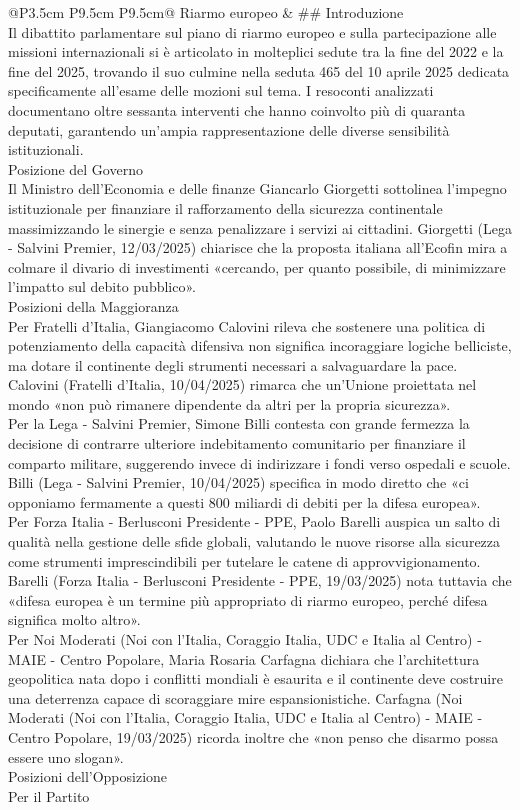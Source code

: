 \documentclass[a4paper,11pt]{article}
\begin{document}
\begin{landscape}
\begin{longtable}{@{}P{3.5cm} P{9.5cm} P{9.5cm}@{}}
\midrule
Riarmo europeo & \#\# Introduzione\\[6pt] Il dibattito parlamentare sul piano di riarmo europeo e sulla partecipazione alle missioni internazionali si è articolato in molteplici sedute tra la fine del 2022 e la fine del 2025, trovando il suo culmine nella seduta 465 del 10 aprile 2025 dedicata specificamente all'esame delle mozioni sul tema. I resoconti analizzati documentano oltre sessanta interventi che hanno coinvolto più di quaranta deputati, garantendo un'ampia rappresentazione delle diverse sensibilità istituzionali.\\[6pt] Posizione del Governo\\[6pt] Il Ministro dell'Economia e delle finanze Giancarlo Giorgetti sottolinea l'impegno istituzionale per finanziare il rafforzamento della sicurezza continentale massimizzando le sinergie e senza penalizzare i servizi ai cittadini. Giorgetti (Lega - Salvini Premier, 12/03/2025) chiarisce che la proposta italiana all'Ecofin mira a colmare il divario di investimenti «cercando, per quanto possibile, di minimizzare l'impatto sul debito pubblico».\\[6pt] Posizioni della Maggioranza\\[6pt] Per Fratelli d'Italia, Giangiacomo Calovini rileva che sostenere una politica di potenziamento della capacità difensiva non significa incoraggiare logiche belliciste, ma dotare il continente degli strumenti necessari a salvaguardare la pace. Calovini (Fratelli d'Italia, 10/04/2025) rimarca che un'Unione proiettata nel mondo «non può rimanere dipendente da altri per la propria sicurezza».\\[6pt] Per la Lega - Salvini Premier, Simone Billi contesta con grande fermezza la decisione di contrarre ulteriore indebitamento comunitario per finanziare il comparto militare, suggerendo invece di indirizzare i fondi verso ospedali e scuole. Billi (Lega - Salvini Premier, 10/04/2025) specifica in modo diretto che «ci opponiamo fermamente a questi 800 miliardi di debiti per la difesa europea».\\[6pt] Per Forza Italia - Berlusconi Presidente - PPE, Paolo Barelli auspica un salto di qualità nella gestione delle sfide globali, valutando le nuove risorse alla sicurezza come strumenti imprescindibili per tutelare le catene di approvvigionamento. Barelli (Forza Italia - Berlusconi Presidente - PPE, 19/03/2025) nota tuttavia che «difesa europea è un termine più appropriato di riarmo europeo, perché difesa significa molto altro».\\[6pt] Per Noi Moderati (Noi con l'Italia, Coraggio Italia, UDC e Italia al Centro) - MAIE - Centro Popolare, Maria Rosaria Carfagna dichiara che l'architettura geopolitica nata dopo i conflitti mondiali è esaurita e il continente deve costruire una deterrenza capace di scoraggiare mire espansionistiche. Carfagna (Noi Moderati (Noi con l'Italia, Coraggio Italia, UDC e Italia al Centro) - MAIE - Centro Popolare, 19/03/2025) ricorda inoltre che «non penso che disarmo possa essere uno slogan».\\[6pt] Posizioni dell'Opposizione\\[6pt] Per il Partito 
\end{longtable}
\end{landscape}
\end{document}
